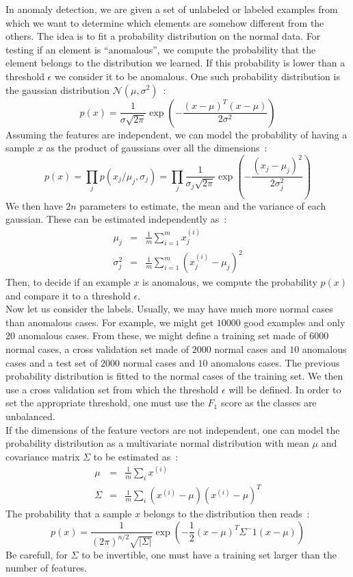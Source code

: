 \documentclass[10pt,a4paper]{article}
\begin{document}
In anomaly detection, we are given a set of unlabeled or labeled examples from
which we want to determine which elements are somehow different from
the others. The idea is to fit a probability distribution on the
normal data. For testing if an element is ``anomalous'', we compute the
probability that the element belongs to the distribution we
learned. If this probability is lower than a threshold $\epsilon$ we
consider it to be anomalous. One such probability distribution is the
gaussian distribution $\mathcal{N}(\mu, \sigma^2)$~:
\begin{equation}
p(x) = \frac{1}{\sigma \sqrt{2\pi}} \exp(-\frac{(x-\mu)^T(x - \mu)}{2\sigma^2})
\end{equation}
Assuming the features are independent, we can model the probability of
having a sample $x$ as the product of gaussians over all the
dimensions~:
\begin{equation}
p(x) = \prod_j p(x_j/\mu_j, \sigma_j) = \prod_j \frac{1}{\sigma_j \sqrt{2\pi}} \exp(-\frac{(x_j-\mu_j)^2}{2\sigma_j^2})
\end{equation}
We then have $2n$ parameters to estimate, the mean and the variance of
each gaussian. These can be estimated independently as~:
\begin{eqnarray}
\mu_j &=& \frac{1}{m}\sum_{i=1}^m x_j^{(i)} \\
\sigma_j^2 &=& \frac{1}{m}\sum_{i=1}^m (x_j^{(i)} - \mu_j)^2
\end{eqnarray}
Then, to decide if an example $x$ is anomalous, we compute the
probability $p(x)$ and compare it to a threshold $\epsilon$.\\

Now let us consider the labels. Usually, we may have much more normal
cases than anomalous cases. For example, we might get $10000$ good
examples and only $20$ anomalous cases. From these, we might define a
training set made of $6000$ normal cases, a cross validation set made
of $2000$ normal cases and $10$ anomalous cases and a test set of
$2000$ normal cases and $10$ anomalous cases. The previous probability distribution
is fitted to the normal cases of the training set. We then use a cross validation set from
which the threshold $\epsilon$ will be defined. In order to set the
appropriate threshold, one must use the $F_1$ score as the classes are
unbalanced.\\

If the dimensions of the feature vectors are not independent, one can
model the probability distribution as a multivariate normal
distribution with mean $\mu$ and covariance matrix $\Sigma$ to be
estimated as~:
\begin{eqnarray}
\mu &=& \frac{1}{m} \sum_i x^{(i)}\\
\Sigma &=& \frac{1}{m} \sum_i (x^{(i)} - \mu) (x^{(i)}-\mu)^T
\end{eqnarray}
The probability that a sample $x$ belongs to the distribution then
reads~:
\begin{equation}
p(x) = \frac{1}{(2\pi)^{n/2} \sqrt{|\Sigma|}} \exp(-\frac{1}{2}
(x-\mu)^T \Sigma^-1 (x-\mu))
\end{equation}
Be carefull, for $\Sigma$ to be invertible, one must have a training
set larger than the number of features.\\
\end{document}
